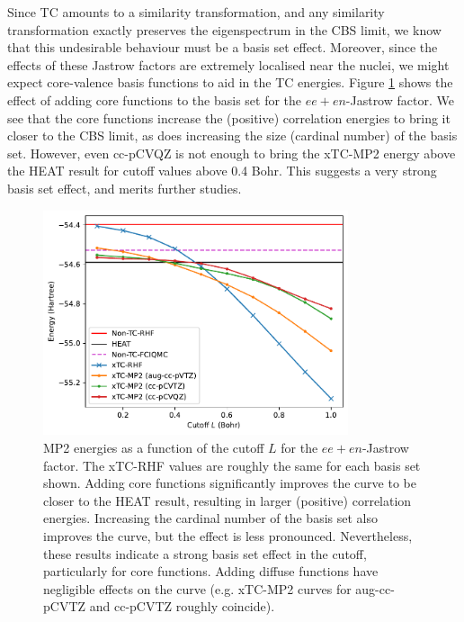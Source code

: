 Since TC amounts to a similarity transformation, and any similarity transformation exactly preserves the eigenspectrum in the CBS limit, we know that this undesirable behaviour must be a basis set effect. Moreover, since the effects of these Jastrow factors are extremely localised near the nuclei, we might expect core-valence basis functions to aid in the TC energies. Figure \ref{fig:basis-vs-cutoff} shows the effect of adding core functions to the basis set for the $ee+en$-Jastrow factor. We see that the core functions increase the (positive) correlation energies to bring it closer to the CBS limit, as does increasing the size (cardinal number) of the basis set. However, even cc-pCVQZ is not enough to bring the xTC-MP2 energy above the HEAT result for cutoff values above 0.4 Bohr. This suggests a very strong basis set effect, and merits further studies.

\begin{figure}[h!]
    \centering
    \includegraphics[width=0.8\textwidth]{figures/universal/cutoffs_basis.pdf}
    \caption{MP2 energies as a function of the cutoff $L$ for the $ee+en$-Jastrow factor. The xTC-RHF values are roughly the same for each basis set shown. Adding core functions significantly improves the curve to be closer to the HEAT result, resulting in larger (positive) correlation energies. Increasing the cardinal number of the basis set also improves the curve, but the effect is less pronounced. Nevertheless, these results indicate a strong basis set effect in the cutoff, particularly for core functions.
    Adding diffuse functions have negligible effects on the curve (e.g. xTC-MP2 curves for aug-cc-pCVTZ and cc-pCVTZ roughly coincide).}
    \label{fig:basis-vs-cutoff}
\end{figure}


